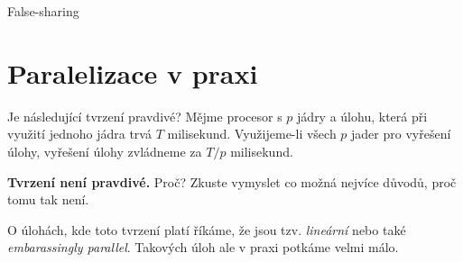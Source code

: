 \documentclass[usenames,dvipsnames,9pt]{beamer}
\newcommand{\see}[1]{\faEye\hspace{5pt}#1}
\begin{document}
\begin{frame}{False-sharing}
  \centering\see{{\tt false\_sharing.cpp}}
\end{frame}

\section{Paralelizace v praxi}
\begin{frame}
  \begin{block}{Je následující tvrzení pravdivé?}
    Mějme procesor s $p$ jádry a úlohu, která při využití jednoho jádra trvá $T$ milisekund.
    Využijeme-li všech $p$ jader pro vyřešení úlohy, vyřešení úlohy zvládneme za $T/p$ milisekund.
  \end{block}
  \pause
  \textcolor{BrickRed}{\bf Tvrzení není pravdivé.} Proč? Zkuste vymyslet co možná nejvíce důvodů, proč tomu tak není.

  \pause\vspace{1.5em}
  O úlohách, kde toto tvrzení platí říkáme, že jsou tzv. \emph{lineární} nebo také \emph{embarassingly parallel}. Takových úloh ale v praxi potkáme velmi málo.
\end{frame}
\end{document}
